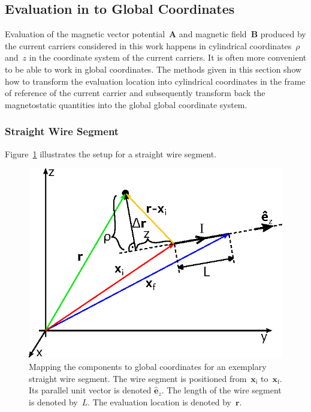 \subsection{Evaluation in to Global Coordinates}
Evaluation of the magnetic vector potential~$\mathbf{A}$ and magnetic field~$\mathbf{B}$
produced by the current carriers considered in this work
happens in cylindrical coordinates~$\rho$ and~$z$
in the coordinate system of the current carriers.
It is often more convenient to be able to work in global coordinates.
The methods given in this section show how to transform the evaluation location
into cylindrical coordinates in the frame of reference of the current carrier
and subsequently transform back the magnetostatic quantities into the global global coordinate system.

\subsubsection{Straight Wire Segment}
Figure~\ref{fig:StraightWireSegment_MappingToCartesian} illustrates the setup for a straight wire segment.
\begin{figure}[htbp]
 \centering
 \includegraphics{img/StraightWireSegment_MappingToCartesian.eps}
 \caption{Mapping the components to global coordinates for an exemplary straight wire segment.
          The wire segment is positioned from~$\mathbf{x}_\mathrm{i}$ to~$\mathbf{x}_\mathrm{f}$.
          Its parallel unit vector is denoted $\hat{\mathbf{e}}_z$.
          The length of the wire segment is denoted by~$L$.
          The evaluation location is denoted by~$\mathbf{r}$.}
 \label{fig:StraightWireSegment_MappingToCartesian}
\end{figure}

